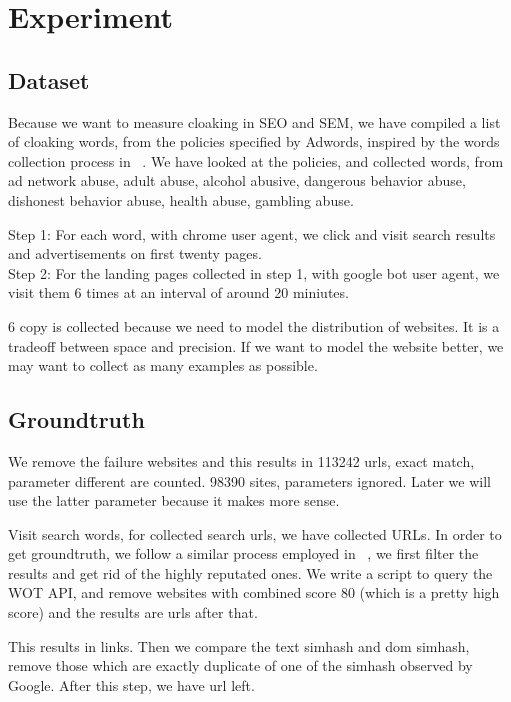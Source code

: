 \section{Experiment}
\label{s:experiment}

\subsection{Dataset}


Because we want to measure cloaking in SEO and SEM, we have compiled a list of
cloaking words, from the policies specified by Adwords, inspired by the words
collection process in ~\cite{wang2011cloak}. We have looked at the policies, and
collected  words, from ad network abuse, adult abuse, alcohol abusive, dangerous behavior
abuse, dishonest behavior abuse, health abuse, gambling abuse.

Step 1: For each word, with chrome user agent, we click and visit search results and advertisements on first
twenty pages. \\
Step 2: For the landing pages collected in step 1, with google bot user agent, we visit them 6 times at an
interval of around 20 miniutes.

6 copy is collected because we need to model the distribution of websites. It is
a tradeoff between space and precision. If we want to model the website better,
we may want to collect as many examples as possible.


\subsection{Groundtruth}

We remove the failure websites and this results in 
113242 urls, exact match, parameter different are counted.
98390 sites, parameters ignored. Later we will use the latter parameter because
it makes more sense.


Visit  search words, for collected search urls, we have collected  URLs.
In order to get groundtruth, we follow a similar process employed in
~\cite{lin2009detection}, we first filter the results and get rid of the highly reputated ones. We write a
script to query the WOT API, and remove websites with combined score 80
(which is a pretty high score) and the results are  urls after that.

This results in  links. Then we compare the text simhash and dom
simhash, remove those which are exactly duplicate of one of the simhash observed
by Google. After this step, we have  url left.

